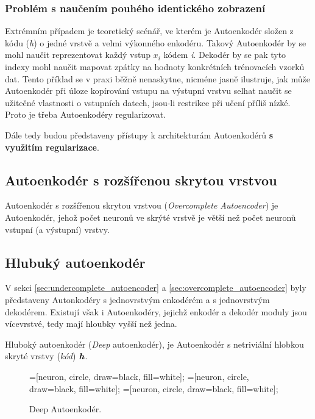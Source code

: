 \subsubsection{Problém s naučením pouhého identického zobrazení}
\label{sec:identity}
Extrémním případem je teoretický scénář, ve kterém je Autoenkodér složen z kódu (\emph{h}) o jedné vrstvě a velmi výkonného enkodéru.
Takový Autoenkodér by se mohl naučit reprezentovat každý vstup $x_i$ kódem \emph{i}.
Dekodér by se pak tyto indexy mohl naučit mapovat zpátky na hodnoty konkrétních trénovacích vzorků dat.
Tento příklad se v praxi běžně nenaskytne, nicméne jasně ilustruje,
jak může Autoenkodér při úloze kopírování vstupu na výstupní vrstvu selhat naučit se užitečné vlastnosti o vstupních datech, jsou-li restrikce při učení příliš nízké.
Proto je třeba Autoenkodéry regularizovat.

Dále tedy budou představeny přístupy k architekturám Autoenkodérů \textbf{s využitím regularizace}.
\subsection{Autoenkodér s rozšířenou skrytou vrstvou}
\label{sec:overcomplete_autoencoder}
Autoenkodér s rozšířenou skrytou vrstvou (\emph{Overcomplete Autoencoder}) je Autoenkodér, jehož počet neuronů ve skrýté vrstvě je větší než počet neuronů vstupní (a výstupní) vrstvy.

\subsection{Hlubuký autoenkodér}
V sekci \autoref{sec:undercomplete_autoencoder} a \autoref{sec:overcomplete_autoencoder} byly představeny Autonkodéry s jednovrstvým enkodérém a s jednovrstvým dekodérem.
Existují však i Autoenkodéry, jejichž enkodér a dekodér moduly jsou vícevrstvé, tedy mají hloubky vyšší než jedna.

Hluboký autoenkodér (\emph{Deep} autoenkodér), je Autoenkodér s netriviální hlobkou skryté vrstvy (\emph{kód}) $\textbf{\emph{h}}$.

\begin{figure}[H]
    \centering
    \begin{neuralnetwork}[height=6]
        =[neuron, circle, draw=black, fill=white];
        =[neuron, circle, draw=black, fill=white];
        =[neuron, circle, draw=black, fill=white];
      
        \hiddenlayer[count=4, bias=false]
        \linklayers
        \hiddenlayer[count=2, bias=false]
        \linklayers
        \hiddenlayer[count=4, bias=false]
        \linklayers
        \outputlayer[count=6, text=\xout]
        \linklayers
      \end{neuralnetwork}
    \caption{Deep Autoenkodér.}
    \label{fig:stacked_autoencoder}
\end{figure}

